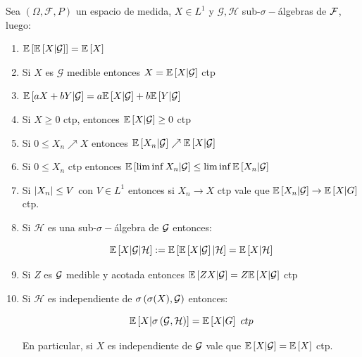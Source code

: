 \begin{theorem}
	\label{theorem: Propiedades de esperanza condicional}
	Sea $\left(\Omega, \mathcal{F}, P\right)$ un espacio de medida, $X \in L^1$ y $\mathcal{G}, \mathcal{H}$ sub-$\sigma-$\'algebras de $\mathcal{F}$, luego:
	
	\begin{enumerate}
		\item $\mathbb{E} \left[\mathbb{E} \left[X \vert \mathcal{G}\right]\right] = \mathbb{E} \left[X\right]$
		\item Si $X$ es $\mathcal{G}$ medible entonces $X = \mathbb{E} \left[X \vert \mathcal{G}\right] $ ctp
		\item $\mathbb{E} \left[aX + bY \vert \mathcal{G}\right] = a\mathbb{E} \left[X \vert \mathcal{G}\right] + b \mathbb{E} \left[Y \vert \mathcal{G}\right]$
		\item Si $X \geq 0$ ctp, entonces $\mathbb{E} \left[X \vert \mathcal{G}\right] \geq 0$ ctp
		\item Si $0 \leq X_n \nearrow X$ entonces $\mathbb{E} \left[X_n \vert \mathcal{G}\right] \nearrow \mathbb{E} \left[X \vert \mathcal{G}\right]$
		\item Si $0 \leq X_n$ ctp entonces $\mathbb{E} \left[\liminf X_n \vert \mathcal{G}\right] \leq \liminf \mathbb{E} \left[X_n \vert \mathcal{G}\right]$
		\item Si $\left\lvert X_n\right\rvert \leq V$ con $V \in L^1$ entonces si $X_n \rightarrow X$ ctp vale que $\mathbb{E} \left[X_n \vert \mathcal{G}\right] \rightarrow \mathbb{E} \left[X \vert G\right]$ ctp.
		\item Si $\mathcal{H}$ es una sub-$\sigma-$\'algebra de $\mathcal{G}$ entonces:
		
		\begin{equation*}
			\mathbb{E} \left[X \vert \mathcal{G} \vert \mathcal{H}\right] := \mathbb{E} \left[\mathbb{E} \left[X \vert \mathcal{G}\right] \vert \mathcal{H}\right] = \mathbb{E} \left[X \vert \mathcal{H}\right]
		\end{equation*}
		
		\item Si $Z$ es $\mathcal{G}$ medible y acotada entonces $\mathbb{E} \left[ZX \vert \mathcal{G}\right] = Z \mathbb{E} \left[X \vert \mathcal{G}\right]$ ctp
		\item Si $\mathcal{H}$ es independiente de $\sigma\left(\sigma(X), \mathcal{G}\right)$ entonces:
		
		\begin{equation*}
			\conditionalExpectation{X}{\sigma \left(\G, \mathcal{H}\right)} = \conditionalExpectation{X}{G} \ ctp
		\end{equation*}
		
		En particular, si $X$ es independiente de $\mathcal{G}$ vale que $\mathbb{E} \left[X \vert \mathcal{G}\right] = \mathbb{E} \left[X\right]$ ctp. 
		
	\end{enumerate}
	
\end{theorem}

